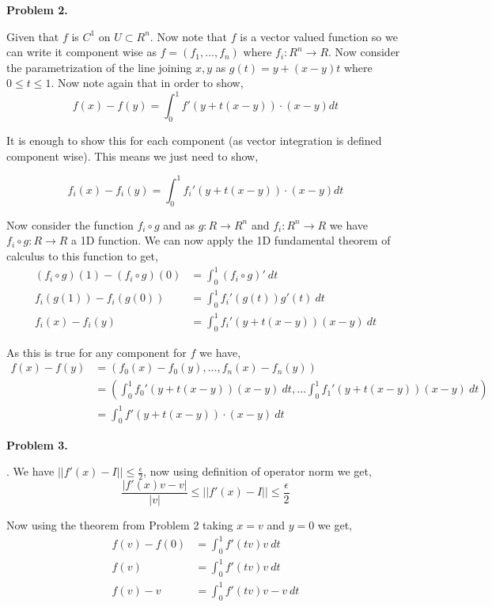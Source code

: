 \documentclass[a4paper]{article}
\begin{document}
\vspace{1em}
\textbf{Problem 2.}

\quad Given that $f$ is $C^{1}$ on $U \subset R^{n}$. Now note that $f$ is a vector valued function so we can write it component wise as $f = (f_{1}, \dots, f_n)$ where $f_i:R^{n} \to R$. Now consider the parametrization of the line joining $x, y$ as $g(t) = y + (x - y)t$ where $0 \le t \le 1$. Now note again that in order to show, 
\[
    f(x) - f(y) = \int_{0}^{1}  f'(y + t(x - y)) \cdot (x - y) dt
\]

It is enough to show this for each component (as vector integration is defined component wise). This means we just need to show,

\[
    f_i(x) - f_i(y) = \int_{0}^{1}  f_i'(y + t(x - y)) \cdot (x - y) dt
\]

Now consider the function $f_i \circ g$ and as $g: R \to R^{n}$ and $f_i: R^{n} \to R$ we have $f_i \circ g: R \to R$ a 1D function. We can now apply the 1D fundamental theorem of calculus to this function to get, 
\begin{align*}
    (f_i \circ g)(1) -  (f_i \circ g)(0) &= \int_{0}^{1} (f_i \circ g)' \ dt\\
                f_i(g(1)) - f_i(g(0)) &= \int_{0}^{1} f_i'(g(t)) g'(t) \ dt\\
                f_i(x) - f_i(y) &= \int_{0}^{1} f_i'(y + t(x - y)) (x - y) \ dt
\end{align*}

As this is true for any component for $f$ we have, 
\begin{align*}
    f(x) - f(y) &= (f_0(x) - f_0(y), \dots, f_n(x) - f_n(y))\\
                &= \left(\int_{0}^{1} f_0'(y + t(x - y)) (x - y) \ dt, \dots \int_{0}^{1} f_1'(y + t(x - y)) (x - y) \ dt \right)\\
                &= \int_{0}^{1} f'(y + t(x - y)) \cdot (x - y) \ dt
\end{align*}        



\vspace{1em}
\textbf{Problem 3.}

. We have $ || f'(x) - I| | \le \frac{\epsilon}{2}$, now using definition of operator norm we get, 
\[
   \frac{ \left | f'(x)v - v \right | }{|v|}\le \left | \left | f'(x) - I \right |\right | \le \frac{\epsilon}{2}
\]

Now using the theorem from Problem 2 taking $x = v$ and $y = 0$ we get, 
\begin{align*}
    f(v) - f(0) &= \int_{0}^{1} f'(tv) v \ dt\\
        f(v) &= \int_{0}^{1} f'(tv) v \ dt \\
        f(v) - v &= \int_{0}^{1} f'(tv) v - v \ dt \\
\end{align*}
\end{document}
